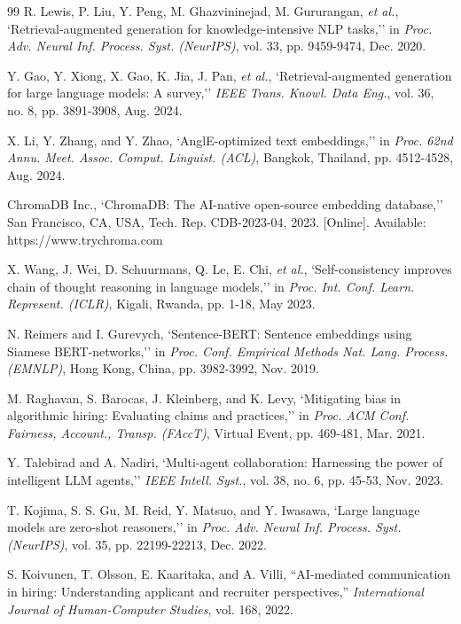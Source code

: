 \documentclass[12pt,a4paper]{report}
\begin{document}
\begin{thebibliography}{99}
R. Lewis, P. Liu, Y. Peng, M. Ghazvininejad, M. Gururangan, \textit{et al.}, `Retrieval-augmented generation for knowledge-intensive NLP tasks,'' in \textit{Proc. Adv. Neural Inf. Process. Syst. (NeurIPS)}, vol. 33, pp. 9459-9474, Dec. 2020.

Y. Gao, Y. Xiong, X. Gao, K. Jia, J. Pan, \textit{et al.}, `Retrieval-augmented generation for large language models: A survey,'' \textit{IEEE Trans. Knowl. Data Eng.}, vol. 36, no. 8, pp. 3891-3908, Aug. 2024.

X. Li, Y. Zhang, and Y. Zhao, `AnglE-optimized text embeddings,'' in \textit{Proc. 62nd Annu. Meet. Assoc. Comput. Linguist. (ACL)}, Bangkok, Thailand, pp. 4512-4528, Aug. 2024.

ChromaDB Inc., `ChromaDB: The AI-native open-source embedding database,'' San Francisco, CA, USA, Tech. Rep. CDB-2023-04, 2023. [Online]. Available: https://www.trychroma.com

X. Wang, J. Wei, D. Schuurmans, Q. Le, E. Chi, \textit{et al.}, `Self-consistency improves chain of thought reasoning in language models,'' in \textit{Proc. Int. Conf. Learn. Represent. (ICLR)}, Kigali, Rwanda, pp. 1-18, May 2023.

N. Reimers and I. Gurevych, `Sentence-BERT: Sentence embeddings using Siamese BERT-networks,'' in \textit{Proc. Conf. Empirical Methods Nat. Lang. Process. (EMNLP)}, Hong Kong, China, pp. 3982-3992, Nov. 2019.

M. Raghavan, S. Barocas, J. Kleinberg, and K. Levy, `Mitigating bias in algorithmic hiring: Evaluating claims and practices,'' in \textit{Proc. ACM Conf. Fairness, Account., Transp. (FAccT)}, Virtual Event, pp. 469-481, Mar. 2021.

Y. Talebirad and A. Nadiri, `Multi-agent collaboration: Harnessing the power of intelligent LLM agents,'' \textit{IEEE Intell. Syst.}, vol. 38, no. 6, pp. 45-53, Nov. 2023.

T. Kojima, S. S. Gu, M. Reid, Y. Matsuo, and Y. Iwasawa, `Large language models are zero-shot reasoners,'' in \textit{Proc. Adv. Neural Inf. Process. Syst. (NeurIPS)}, vol. 35, pp. 22199-22213, Dec. 2022.

S. Koivunen, T. Olsson, E. Kaaritaka, and A. Villi, ``AI-mediated communication in hiring: Understanding applicant and recruiter perspectives,'' \textit{International Journal of Human-Computer Studies}, vol. 168, 2022.


\end{thebibliography}
\end{document}
